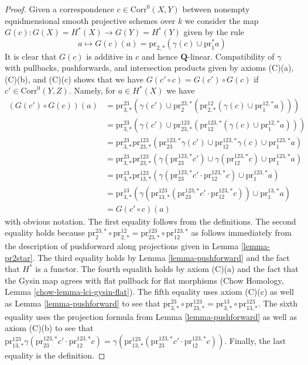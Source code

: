 \documentclass{stacks-project}
\theoremstyle{plain}
\theoremstyle{definition}
\theoremstyle{remark}
\numberwithin{equation}{subsection}
\begin{document}
\begin{proof}
\medskip\noindent
Given a correspondence $c \in \text{Corr}^0(X, Y)$ between
nonempty equidmensional smooth projective schemes over $k$
we consider the map $G(c) : G(X) = H^*(X) \to G(Y) = H^*(Y)$
given by the rule
$$
a \longmapsto
G(c)(a) = \text{pr}_{2, *}(\gamma(c) \cup \text{pr}_1^*a)
$$
It is clear that $G(c)$ is additive in $c$ and hence $\mathbf{Q}$-linear.
Compatibility of $\gamma$ with pullbacks, pushforwards, and
intersection products given by axioms (C)(a), (C)(b), and (C)(c)
shows that we have
$G(c' \circ c) = G(c') \circ G(c)$ if $c' \in \text{Corr}^0(Y, Z)$.
Namely, for $a \in H^*(X)$ we have
\begin{align*}
(G(c') \circ G(c))(a)
& =
\text{pr}^{23}_{3, *}(\gamma(c') \cup
\text{pr}^{23, *}_2(\text{pr}^{12}_{2, *}(\gamma(c) \cup
\text{pr}^{12, *}_1a))) \\
& =
\text{pr}^{23}_{3, *}(\gamma(c') \cup
\text{pr}^{123}_{23, *}(\text{pr}^{123, *}_{12}(\gamma(c) \cup
\text{pr}^{12, *}_1 a))) \\
& =
\text{pr}^{23}_{3, *}
\text{pr}^{123}_{23, *}(
\text{pr}^{123, *}_{23}\gamma(c') \cup
\text{pr}^{123, *}_{12}\gamma(c) \cup
\text{pr}^{123, *}_1 a) \\
& =
\text{pr}^{23}_{3, *}
\text{pr}^{123}_{23, *}(
\gamma(\text{pr}^{123, *}_{23}c') \cup
\gamma(\text{pr}^{123, *}_{12}c) \cup
\text{pr}^{123, *}_1 a) \\
& =
\text{pr}^{13}_{3, *}
\text{pr}^{123}_{13, *}(
\gamma(\text{pr}^{123, *}_{23}c' \cdot \text{pr}^{123, *}_{12}c) \cup
\text{pr}^{123, *}_1 a) \\
& =
\text{pr}^{13}_{3, *}(
\gamma(\text{pr}^{123}_{13, *}(\text{pr}^{123, *}_{23}c' \cdot
\text{pr}^{123, *}_{12}c)) \cup
\text{pr}^{13, *}_1 a) \\
& =
G(c' \circ c)(a)
\end{align*}
with obvious notation. The first equality follows from the definitions.
The second equality holds because
$\text{pr}^{23, *}_2 \circ \text{pr}^{12}_{2, *} =
\text{pr}^{123}_{23, *} \circ \text{pr}^{123, *}_{12}$
as follows immediately from the description of pushforward
along projections given in Lemma \ref{lemma-pr2star}.
The third equality holds by Lemma \ref{lemma-pushforward}
and the fact that $H^*$ is a functor.
The fourth equalith holds by axiom (C)(a) and the fact that
the Gysin map agrees with flat pullback for flat morphisms
(Chow Homology, Lemma \ref{chow-lemma-lci-gysin-flat}).
The fifth equality uses axiom (C)(c) as well as
Lemma \ref{lemma-pushforward} to see that
$\text{pr}^{23}_{3, *} \circ \text{pr}^{123}_{23, *} =
\text{pr}^{13}_{3, *} \circ \text{pr}^{123}_{13, *}$.
The sixth equality uses the projection formula from
Lemma \ref{lemma-pushforward} as well as
axiom (C)(b) to see that $
\text{pr}^{123}_{13, *}
\gamma(\text{pr}^{123, *}_{23}c' \cdot \text{pr}^{123, *}_{12}c) =
\gamma(\text{pr}^{123}_{13, *}(
\text{pr}^{123, *}_{23}c' \cdot \text{pr}^{123, *}_{12}c))$.
Finally, the last equality is the definition.


\end{proof}
\end{document}
